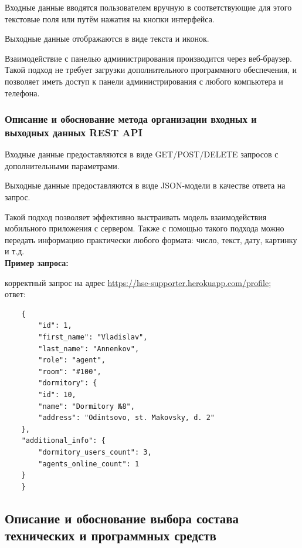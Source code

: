\documentclass{../includes/TechDoc}
\begin{document}
    Входные данные вводятся пользователем вручную в соответствующие для этого текстовые поля или путём нажатия на кнопки интерфейса.

    Выходные данные отображаются в виде текста и иконок.

    Взаимодействие с панелью администрирования производится через веб-браузер.
    Такой подход не требует загрузки дополнительного программного обеспечения, и позволяет иметь доступ к
    панели администрирования с любого компьютера и телефона.

    \subsubsection{Описание и обоснование метода организации входных и выходных данных REST API}

    Входные данные предоставляются в виде GET/POST/DELETE запросов с дополнительными параметрами.

    Выходные данные предоставляются в виде JSON-модели в качестве ответа на запрос.

    Такой подход позволяет эффективно выстраивать модель взаимодействия мобильного приложения с сервером.
    Также с помощью такого подхода можно передать информацию практически любого формата: число, текст, дату, картинку и т.д.\\

    \noindent\textbf{Пример запроса:}

     корректный запрос на адрес \url{https://hse-supporter.herokuapp.com/profile};\\

     ответ:
    \begin{lstlisting}
    {
        "id": 1,
        "first_name": "Vladislav",
        "last_name": "Annenkov",
        "role": "agent",
        "room": "#100",
        "dormitory": {
        "id": 10,
        "name": "Dormitory №8",
        "address": "Odintsovo, st. Makovsky, d. 2"
    },
    "additional_info": {
        "dormitory_users_count": 3,
        "agents_online_count": 1
    }
    }
    \end{lstlisting}

    \clearpage

    \subsection{Описание и обоснование выбора состава технических и программных средств}
\end{document}
